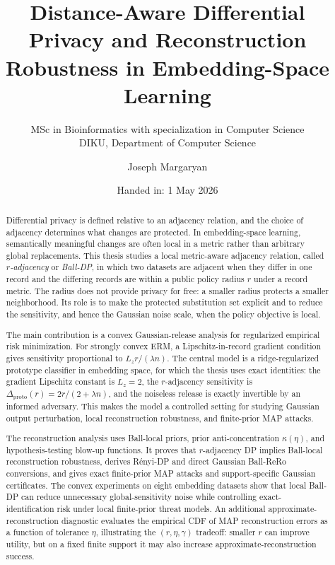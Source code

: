 \documentclass[11pt,a4paper]{report}
\author{Joseph Margaryan}
\title{Distance-Aware Differential Privacy and Reconstruction Robustness in Embedding-Space Learning}
\subtitle{MSc in Bioinformatics with specialization in Computer Science\\DIKU, Department of Computer Science}
\date{Handed in: 1 May 2026}
\theoremstyle{plain}
\theoremstyle{definition}
\theoremstyle{remark}
\begin{document}
\maketitle

\begin{abstract}
Differential privacy is defined relative to an adjacency relation, and the choice of adjacency determines what changes are protected.  In embedding-space learning, semantically meaningful changes are often local in a metric rather than arbitrary global replacements.  This thesis studies a local metric-aware adjacency relation, called \emph{$r$-adjacency} or \emph{Ball-DP}, in which two datasets are adjacent when they differ in one record and the differing records are within a public policy radius $r$ under a record metric.  The radius does not provide privacy for free: a smaller radius protects a smaller neighborhood.  Its role is to make the protected substitution set explicit and to reduce the sensitivity, and hence the Gaussian noise scale, when the policy objective is local.

The main contribution is a convex Gaussian-release analysis for regularized empirical risk minimization.  For strongly convex ERM, a Lipschitz-in-record gradient condition gives sensitivity proportional to $L_z r/(\lambda n)$.  The central model is a ridge-regularized prototype classifier in embedding space, for which the thesis uses exact identities: the gradient Lipschitz constant is $L_z=2$, the $r$-adjacency sensitivity is $\Delta_{\mathrm{proto}}(r)=2r/(2+\lambda n)$, and the noiseless release is exactly invertible by an informed adversary.  This makes the model a controlled setting for studying Gaussian output perturbation, local reconstruction robustness, and finite-prior MAP attacks.

The reconstruction analysis uses Ball-local priors, prior anti-concentration $\kappa(\eta)$, and hypothesis-testing blow-up functions.  It proves that $r$-adjacency DP implies Ball-local reconstruction robustness, derives R\'enyi-DP and direct Gaussian Ball-ReRo conversions, and gives exact finite-prior MAP attacks and support-specific Gaussian certificates.  The convex experiments on eight embedding datasets show that local Ball-DP can reduce unnecessary global-sensitivity noise while controlling exact-identification risk under local finite-prior threat models.  An additional approximate-reconstruction diagnostic evaluates the empirical CDF of MAP reconstruction errors as a function of tolerance $\eta$, illustrating the $(r,\eta,\gamma)$ tradeoff: smaller $r$ can improve utility, but on a fixed finite support it may also increase approximate-reconstruction success.


\end{abstract}
\end{document}
